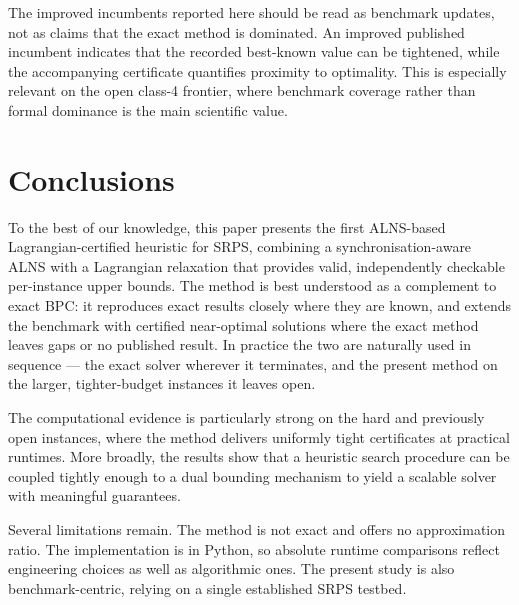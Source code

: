 \documentclass[preprint,12pt]{elsarticle}
\begin{document}
The improved incumbents reported here should be read as benchmark updates, not as claims that the exact method is dominated. An improved published incumbent indicates that the recorded best-known value can be tightened, while the accompanying certificate quantifies proximity to optimality. This is especially relevant on the open class-4 frontier, where benchmark coverage rather than formal dominance is the main scientific value.

\section{Conclusions}\label{sec:conclusion}

To the best of our knowledge, this paper presents the first ALNS-based Lagrangian-certified heuristic for SRPS, combining a synchronisation-aware ALNS with a Lagrangian relaxation that provides valid, independently checkable per-instance upper bounds. The method is best understood as a complement to exact BPC: it reproduces exact results closely where they are known, and extends the benchmark with certified near-optimal solutions where the exact method leaves gaps or no published result. In practice the two are naturally used in sequence --- the exact solver wherever it terminates, and the present method on the larger, tighter-budget instances it leaves open.

The computational evidence is particularly strong on the hard and previously open instances, where the method delivers uniformly tight certificates at practical runtimes. More broadly, the results show that a heuristic search procedure can be coupled tightly enough to a dual bounding mechanism to yield a scalable solver with meaningful guarantees.

Several limitations remain. The method is not exact and offers no approximation ratio. The implementation is in Python, so absolute runtime comparisons reflect engineering choices as well as algorithmic ones. The present study is also benchmark-centric, relying on a single established SRPS testbed.
\end{document}
